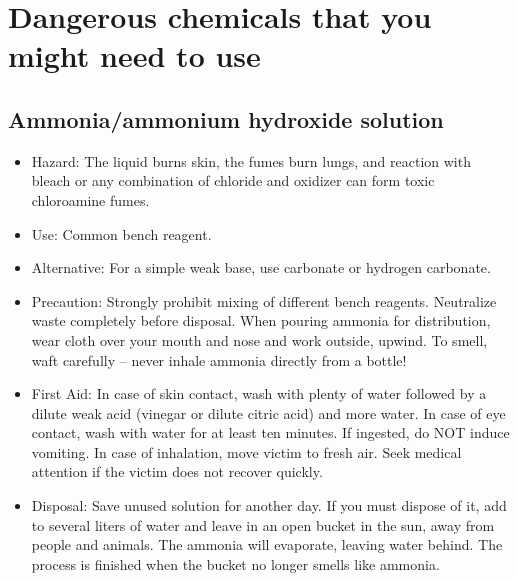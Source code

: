 \section{Dangerous chemicals that you might need to use}
\subsection{Ammonia/ammonium hydroxide solution}
\begin{itemize}
\item{Hazard: The liquid burns skin, the fumes burn lungs, 
and reaction with bleach or any combination of chloride and oxidizer 
can form toxic chloroamine fumes.}
\item{Use: Common bench reagent.}
\item{Alternative: For a simple weak base, 
use carbonate or hydrogen carbonate.}
\item{Precaution: Strongly prohibit mixing of different bench reagents. 
Neutralize waste completely before disposal. 
When pouring ammonia for distribution, 
wear cloth over your mouth and nose and work outside, upwind. 
To smell, waft carefully – never inhale ammonia directly from a bottle!}
\item{First Aid: In case of skin contact, 
wash with plenty of water followed by a dilute weak acid 
(vinegar or dilute citric acid) and more water. 
In case of eye contact, wash with water for at least ten minutes. 
If ingested, do NOT induce vomiting. 
In case of inhalation, move victim to fresh air. 
Seek medical attention if the victim does not recover quickly.}
\item{Disposal: Save unused solution for another day. 
If you must dispose of it, add to several liters of water 
and leave in an open bucket in the sun, 
away from people and animals. 
The ammonia will evaporate, leaving water behind. 
The process is finished when the bucket no longer smells like ammonia.}
\end{itemize}

